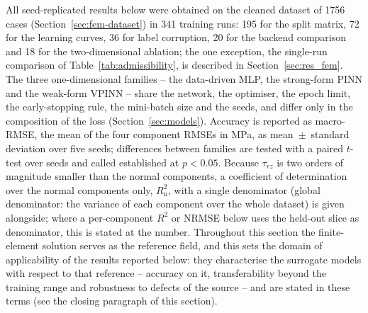 All seed-replicated results below were obtained on the cleaned dataset of 1756 cases (Section~\ref{sec:fem-dataset}) in 341 training runs: 195 for the split matrix, 72 for the learning curves, 36 for label corruption, 20 for the backend comparison and 18 for the two-dimensional ablation; the one exception, the single-run comparison of Table~\ref{tab:admissibility}, is described in Section~\ref{sec:res_fem}. %
The three one-dimensional families -- the data-driven MLP, the strong-form PINN and the weak-form VPINN -- share the network, the optimiser, the epoch limit, the early-stopping rule, the mini-batch size and the seeds, and differ only in the composition of the loss (Section~\ref{sec:models}). Accuracy is reported as macro-RMSE, the mean of the four component RMSEs in MPa, as mean~$\pm$~standard deviation over five seeds; differences between families are tested with a paired $t$-test over seeds \cite{TODO-paired-test-over-seeds} and called established at $p<0.05$. Because $\tau_{rz}$ is two orders of magnitude smaller than the normal components, a coefficient of determination over the normal components only, $R^2_{\mathrm{n}}$, with a single denominator (global denominator: the variance of each component over the whole dataset) is given alongside; where a per-component $R^2$ or NRMSE below uses the held-out slice as denominator, this is stated at the number. %
Throughout this section the finite-element solution serves as the reference field, and this sets the domain of applicability of the results reported below: they characterise the surrogate models with respect to that reference -- accuracy on it, transferability beyond the training range and robustness to defects of the source -- and are stated in these terms (see the closing paragraph of this section). %

